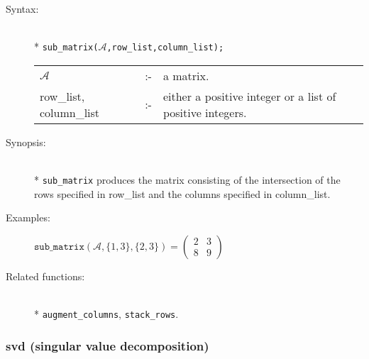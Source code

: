 \begin{description}
\item[Syntax:]\mbox{}\\*
\texttt{sub\_matrix($\mathcal{A}$,row\_list,column\_list);}\\[2mm]
\begin{tabular}{l l p{.605\linewidth}}
$\mathcal{A}$              &:-& a matrix. \\
row\_list, column\_list &:-& either a
positive integer or a list of positive integers.
\end{tabular}

\item[Synopsis:]\mbox{}\\*
\texttt{sub\_matrix} produces the matrix consisting of the
              intersection of the rows specified in row\_list and the
columns specified in column\_list.

\item[Examples:]
\begin{flushleft}
\(
\texttt{sub\_matrix}(\mathcal{A},\{1,3\},\{2,3\}) =
        \begin{pmatrix} 2 & 3 \\ 8 & 9 \end{pmatrix}
\)
\end{flushleft}

\item[Related functions:]\mbox{}\\*
\texttt{augment\_columns}, \texttt{stack\_rows}.
\end{description}


\subsubsection{svd (singular value decomposition)}
\label{linalg:svd}


